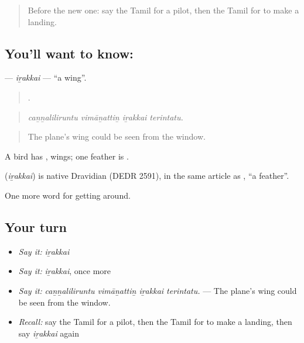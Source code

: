 \label{lesson:TA-C413-irakkai}



\begin{quote}
Before the new one: say the Tamil for a pilot, then the Tamil for to make a landing.
\end{quote}

\subsection*{You'll want to know: }
\textbf{} — \emph{iṟakkai} — \textquotedblleft{}a wing\textquotedblright{}.

\begin{quote}
   .
\end{quote}

\begin{quote}
\emph{caṉṉaliliruntu vimāṉattiṉ iṟakkai terintatu.}
\end{quote}

\begin{quote}
The plane's wing could be seen from the window.
\end{quote}

A bird has , wings; one feather is .

\begin{cousinweb}
\textbf{} (\emph{iṟakkai}) is native Dravidian (DEDR 2591), in the same article as , \textquotedblleft{}a feather\textquotedblright{}.
\end{cousinweb}

\begin{grammarlens}[title={What you've built}]
One more word for getting around.
\end{grammarlens}

\subsection*{Your turn}
\begin{itemize}
\raggedright
  \item \emph{Say it:} \emph{iṟakkai}
  \item \emph{Say it:} \emph{iṟakkai}, once more
  \item \emph{Say it:} \emph{caṉṉaliliruntu vimāṉattiṉ iṟakkai terintatu.} — The plane's wing could be seen from the window.
  \item \emph{Recall:} say the Tamil for a pilot, then the Tamil for to make a landing, then say \emph{iṟakkai} again
\end{itemize}

